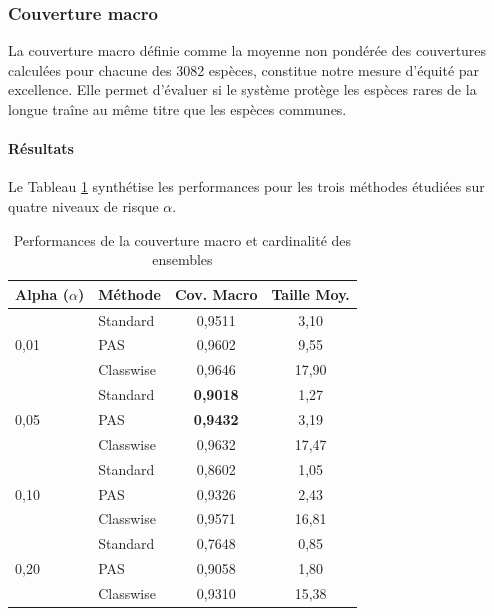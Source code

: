 \documentclass[12pt,a4paper]{article}
\begin{document}
\subsubsection{Couverture macro}

La couverture macro définie comme la moyenne non pondérée des couvertures calculées pour chacune des 3082 espèces, constitue notre mesure d'équité par excellence. Elle permet d'évaluer si le système protège les espèces rares de la longue traîne au même titre que les espèces communes.


\paragraph{Résultats}

Le Tableau \ref{tab:macro_naive} synthétise les performances pour les trois méthodes étudiées sur quatre niveaux de risque $\alpha$.


\begin{table}[h!]
\centering
\renewcommand{\arraystretch}{1.0} %
\setlength{\tabcolsep}{4pt} %
\begin{tabular}{|l|l|c|c|}
\hline
\textbf{Alpha ($\alpha$)} & \textbf{Méthode} & \textbf{Cov. Macro} & \textbf{Taille Moy.} \\
\hline

\multirow{3}{*}{0,01} & Standard  & 0,9511 & 3,10 \\
                      & PAS       & 0,9602 & 9,55 \\
                      & Classwise & 0,9646 & 17,90 \\
\hline

\multirow{3}{*}{0,05} & Standard  & \textbf{0,9018} & 1,27 \\
                      & PAS       & \textbf{0,9432} & 3,19 \\
                      & Classwise & 0,9632 & 17,47 \\
\hline

\multirow{3}{*}{0,10} & Standard  & 0,8602 & 1,05 \\
                      & PAS       & 0,9326 & 2,43 \\
                      & Classwise & 0,9571 & 16,81 \\
\hline

\multirow{3}{*}{0,20} & Standard  & 0,7648 & 0,85 \\
                      & PAS       & 0,9058 & 1,80 \\
                      & Classwise & 0,9310 & 15,38 \\
\hline
\end{tabular}
\caption{Performances de la couverture macro et cardinalité des ensembles}
\label{tab:macro_naive}
\end{table}
\end{document}
